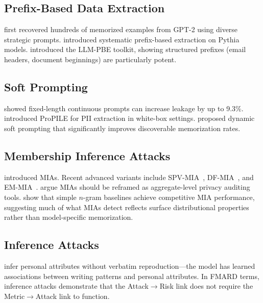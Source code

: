 \documentclass[11pt]{article}
\begin{document}
\subsection{Prefix-Based Data Extraction}

\citet{carlini2021extractingtrainingdatalarge} first recovered hundreds of
memorized examples from GPT-2 using diverse strategic prompts.
\citet{carlini2023quantifyingmemorizationneurallanguage} introduced systematic
prefix-based extraction on Pythia models.
\citet{li2024llmpbeassessingdataprivacy} introduced the LLM-PBE toolkit,
showing structured prefixes (email headers, document beginnings) are
particularly potent.

\subsection{Soft Prompting}

\citet{ozdayi2023controllingextractionmemorizeddata} showed fixed-length
continuous prompts can increase leakage by up to 9.3\%.
\citet{kim2023propile} introduced ProPILE for PII extraction in white-box
settings.
\citet{wang-etal-2024-unlocking} proposed dynamic soft prompting that
significantly improves discoverable memorization rates.

\subsection{Membership Inference Attacks}

\citet{shokri2017membership} introduced MIAs.
Recent advanced variants include SPV-MIA~\citep{fu2024membership},
DF-MIA~\citep{huang2025df}, and EM-MIA~\citep{song2025mias}.
\citet{zhang2025membershipinferenceattacksprove} argue MIAs should be
reframed as aggregate-level privacy auditing tools.
\citet{hallinan2025surprisingeffectivenessmembershipinference} show that
simple $n$-gram baselines achieve competitive MIA performance, suggesting
much of what MIAs detect reflects surface distributional properties rather
than model-specific memorization.

\subsection{Inference Attacks}

\citet{staab2024memorizationviolatingprivacyinference} infer personal
attributes without verbatim reproduction---the model has learned
associations between writing patterns and personal attributes.
In FMARD terms, inference attacks demonstrate that the Attack$\to$Risk link
does not require the Metric$\to$Attack link to function.
\end{document}
